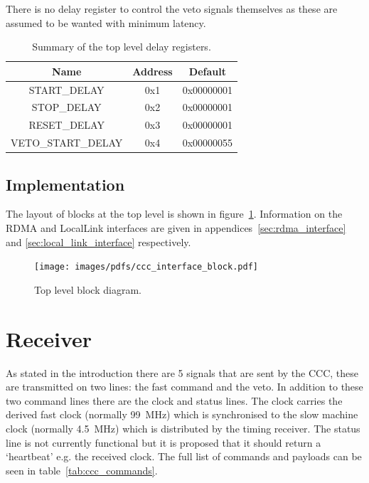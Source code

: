 \documentclass[]{report}
\begin{document}
    There is no delay register to control the veto signals themselves as these are assumed to be wanted with minimum latency.
    
    \begin{table}
        \begin{center}
            \begin{tabular}{c | c | c }
                Name               & Address & Default    \\
                \hline
                START\_DELAY       & 0x1     & 0x00000001 \\
                STOP\_DELAY        & 0x2     & 0x00000001 \\
                RESET\_DELAY       & 0x3     & 0x00000001 \\
                VETO\_START\_DELAY & 0x4     & 0x00000055 \\
            \end{tabular}
        \end{center}
        \caption{Summary of the top level delay registers.}
        \label{tab:delay_regs}
    \end{table}
    \section{Implementation} %
    \label{sub:top_implementation}
    The layout of blocks at the top level is shown in figure~\ref{fig:ccc_interface_block}. Information on the RDMA and LocalLink interfaces are given in appendices~\ref{sec:rdma_interface} and \ref{sec:local_link_interface} respectively.
    
    \begin{figure}[htbp]
        \centering
            \texttt{[image: images/pdfs/ccc\_interface\_block.pdf]}
        \caption{Top level block diagram.}
        \label{fig:ccc_interface_block}
    \end{figure}
    
    \chapter{Receiver} %
    \label{sec:receiver}
    As stated in the introduction there are 5 signals that are sent by the CCC, these are transmitted on two lines: the fast command and the veto. In addition to these two command lines there are the clock and status lines. The clock carries the derived fast clock (normally 99~MHz) which is synchronised to the slow machine clock (normally 4.5~MHz) which is distributed by the timing receiver. The status line is not currently functional but it is proposed that it should return a `heartbeat' e.g. the received clock. The full list of commands and payloads can be seen in table~\ref{tab:ccc_commands}.
  
\end{document}
